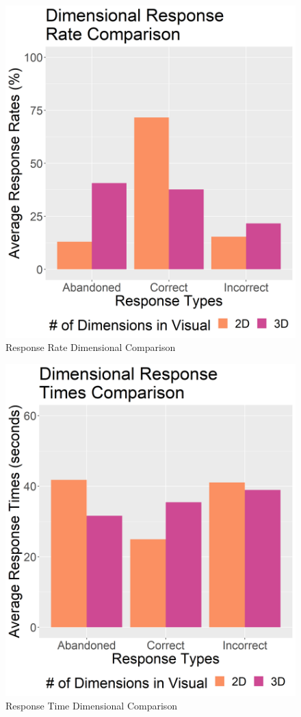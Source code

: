 \documentclass[twocolumn]{article}
\begin{document}
		\begin{figure}[H]
			\includegraphics[scale=0.415]{response_rate_dimensional_comparison.png}
			\caption{Response Rate Dimensional Comparison}
			\label{Response Rate Dimensional Comparison}
		\end{figure}
		\begin{figure}[H]
			\includegraphics[scale=0.415]{response_time_dimensional_comparison.png}
			\caption{Response Time Dimensional Comparison}
			\label{Response Time Dimensional Comparison}
		\end{figure}
	
\end{document}
